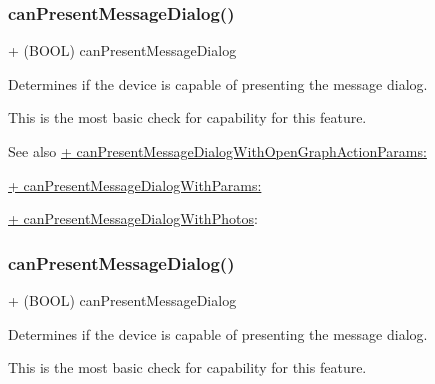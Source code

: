 \subsubsection{\texorpdfstring{can\+Present\+Message\+Dialog()}{canPresentMessageDialog()}\hspace{0.1cm}{\footnotesize\ttfamily [2/5]}}
{\footnotesize\ttfamily + (B\+O\+OL) can\+Present\+Message\+Dialog \begin{DoxyParamCaption}{ }\end{DoxyParamCaption}}

Determines if the device is capable of presenting the message dialog.

This is the most basic check for capability for this feature.

\begin{DoxySeeAlso}{See also}
\hyperlink{interfaceFBDialogs_abc596dd117701ceb160dd63db514cf11}{+ can\+Present\+Message\+Dialog\+With\+Open\+Graph\+Action\+Params\+:} 

\hyperlink{interfaceFBDialogs_a81544299ca98179464ec34fc0e8d12b7}{+ can\+Present\+Message\+Dialog\+With\+Params\+:} 

\hyperlink{interfaceFBDialogs_ac10e310c30d763c7885c11fb44ac4924}{+ can\+Present\+Message\+Dialog\+With\+Photos}\+: 
\end{DoxySeeAlso}
\mbox{\label{interfaceFBDialogs_aa41db27dd00b0c59e01d45f72b9045aa}} 
\subsubsection{\texorpdfstring{can\+Present\+Message\+Dialog()}{canPresentMessageDialog()}\hspace{0.1cm}{\footnotesize\ttfamily [3/5]}}
{\footnotesize\ttfamily + (B\+O\+OL) can\+Present\+Message\+Dialog \begin{DoxyParamCaption}{ }\end{DoxyParamCaption}}

Determines if the device is capable of presenting the message dialog.

This is the most basic check for capability for this feature.

